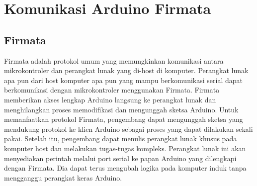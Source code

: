 \section{Komunikasi Arduino Firmata}
\subsection{Firmata}
	Firmata adalah protokol umum yang memungkinkan komunikasi antara mikrokontroler dan perangkat lunak yang di-host di komputer. 
	Perangkat lunak apa pun dari host komputer apa pun yang mampu berkomunikasi serial dapat berkomunikasi dengan mikrokontroler menggunakan Firmata. 
	Firmata memberikan akses lengkap Arduino langsung ke perangkat lunak dan menghilangkan proses memodifikasi dan mengunggah sketsa Arduino. 
	Untuk memanfaatkan protokol Firmata, pengembang dapat mengunggah sketsa yang mendukung protokol ke klien Arduino sebagai proses yang dapat dilakukan sekali pakai. 
	Setelah itu, pengembang dapat menulis perangkat lunak khusus pada komputer host dan melakukan tugas-tugas kompleks. Perangkat lunak ini akan menyediakan perintah melalui port serial ke papan Arduino yang dilengkapi dengan Firmata. Dia dapat terus mengubah logika pada komputer induk tanpa mengganggu perangkat keras Arduino. 

